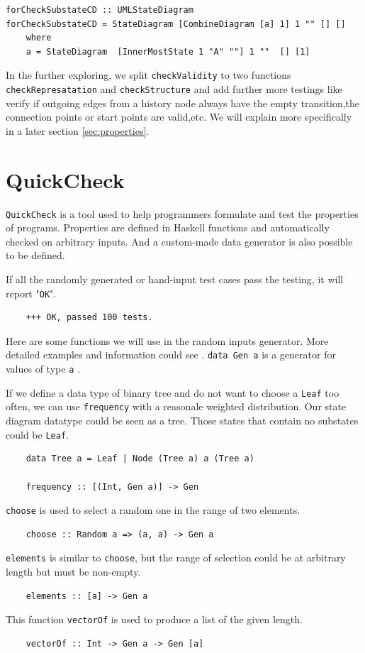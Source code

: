 \begin{verbatim}
forCheckSubstateCD :: UMLStateDiagram
forCheckSubstateCD = StateDiagram [CombineDiagram [a] 1] 1 "" [] []
    where
    a = StateDiagram  [InnerMostState 1 "A" ""] 1 ""  [] [1]
\end{verbatim}


In the further exploring, we split \verb|checkValidity| to two functions \verb|checkRepresatation| and \verb|checkStructure| and add further more testings like verify if outgoing edges from a history node always have the empty transition,the connection points or start points are valid,etc.
We will explain more specifically in a later section \ref{sec:properties}.



\section{ QuickCheck}
\verb|QuickCheck| \cite{claessen_hughes_2000} is a tool used to help programmers formulate and test the properties of programs. 
Properties are defined in Haskell functions and automatically checked on arbitrary inputs.
And a custom-made data generator is also possible to be defined.

If all the randomly generated or hand-input test cases pass the testing, 
it will report "\verb|OK|".
\begin{verbatim}
    +++ OK, passed 100 tests.
\end{verbatim}
Here are some functions we will use in the random inputs generator. 
More detailed examples and information could see \cite{quickcheck}.
\verb|data Gen a| is a generator for values of type \verb|a| \cite{quickcheck}.

If we define a data type of binary tree and do not want to choose a \verb|Leaf| too often,
we can use \verb|frequency| with a reasonale weighted distribution.
Our state diagram datatype could be seen as a tree.
Those states that contain no substates could be \verb|Leaf|.
\begin{verbatim}
    data Tree a = Leaf | Node (Tree a) a (Tree a)
    
    frequency :: [(Int, Gen a)] -> Gen   
\end{verbatim}
\verb|choose| is used to select a random one in the range of two elements.
\begin{verbatim}
    choose :: Random a => (a, a) -> Gen a  
\end{verbatim}
\verb|elements| is similar to \verb|choose|,
but the range of selection could be at arbitrary length but must be non-empty.
\begin{verbatim}
    elements :: [a] -> Gen a 
\end{verbatim}
This function \verb|vectorOf| is used to produce a list of the given length.
\begin{verbatim}
    vectorOf :: Int -> Gen a -> Gen [a]  
\end{verbatim}


